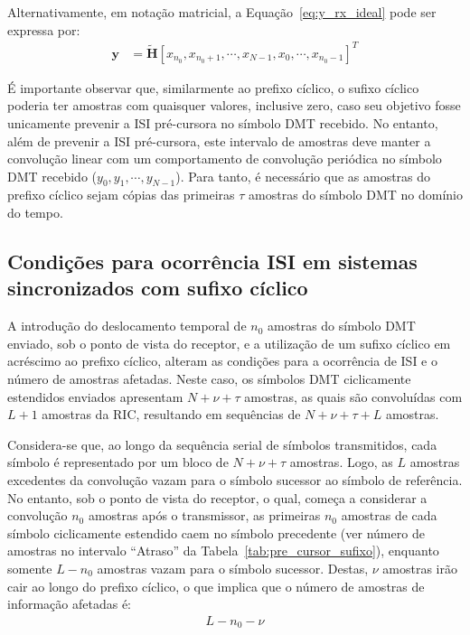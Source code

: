Alternativamente, em notação matricial, a Equação~\ref{eq:y_rx_ideal} pode ser expressa por:
\begin{align}
\mathbf{y} & = \mathbf{\tilde{H}} \left[ x_{n_0}, x_{n_0 + 1}, \cdots, x_{N-1}, x_0, \cdots, x_{n_0 -1} \right]^T
\end{align}

É importante observar que, similarmente ao prefixo cíclico, o sufixo cíclico poderia ter amostras com quaisquer valores, inclusive zero, caso seu objetivo fosse unicamente prevenir a ISI pré-cursora no símbolo DMT recebido.  No entanto, além de prevenir a ISI pré-cursora, este intervalo de amostras deve manter a convolução linear com um comportamento de convolução periódica no símbolo DMT recebido ($y_0, y_1, \cdots, y_{N-1}$).  Para tanto, é necessário que as amostras do prefixo cíclico sejam cópias das primeiras $\tau$ amostras do símbolo DMT no domínio do tempo. 

\subsection{Condições para ocorrência ISI em sistemas sincronizados com sufixo cíclico}

A introdução do deslocamento temporal de $n_0$ amostras do símbolo DMT enviado, sob o ponto de vista do receptor, e a utilização de um sufixo cíclico em acréscimo ao prefixo cíclico, alteram as condições para a ocorrência de ISI e o número de amostras afetadas. Neste caso, os símbolos DMT ciclicamente estendidos enviados apresentam $ N + \nu + \tau$ amostras, as quais são convoluídas com $L + 1$ amostras da RIC, resultando em sequências de $N + \nu + \tau + L$ amostras.

Considera-se que, ao longo da sequência serial de símbolos transmitidos, cada símbolo é representado por um bloco de $N + \nu + \tau$ amostras. Logo, as $L$ amostras excedentes da convolução vazam para o símbolo sucessor ao símbolo de referência. No entanto, sob o ponto de vista do receptor, o qual, começa a considerar a convolução $n_0$ amostras após o transmissor, as primeiras $n_0$ amostras de cada símbolo ciclicamente estendido caem no símbolo precedente (ver número de amostras no intervalo ``Atraso'' da Tabela~\ref{tab:pre_cursor_sufixo}), enquanto somente $L - n_0$ amostras vazam para o símbolo sucessor. Destas, $\nu$ amostras irão cair ao longo do prefixo cíclico, o que implica que o número de amostras de informação afetadas é:
\begin{align}
L - n_0 - \nu \nonumber
\end{align}

